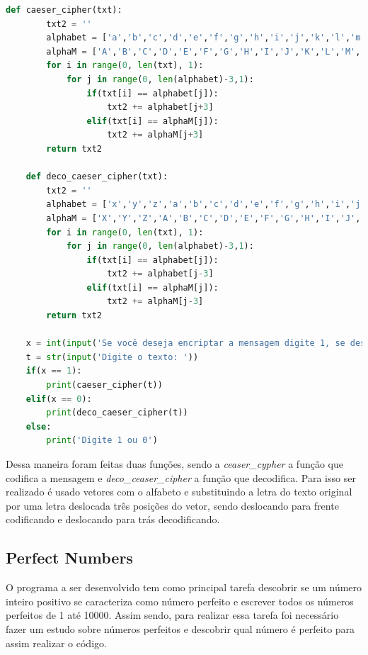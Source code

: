 \begin{lstlisting}[language=python]
    def caeser_cipher(txt):
        txt2 = ''
        alphabet = ['a','b','c','d','e','f','g','h','i','j','k','l','m','n','o','p','q','r','s','t','u','v','w','x','y','z','a','b','c']
        alphaM = ['A','B','C','D','E','F','G','H','I','J','K','L','M','N','O','P','Q','R','S','T','U','V','W','X','Y','Z','A','B','C']
        for i in range(0, len(txt), 1):
            for j in range(0, len(alphabet)-3,1):
                if(txt[i] == alphabet[j]):
                    txt2 += alphabet[j+3]
                elif(txt[i] == alphaM[j]):
                    txt2 += alphaM[j+3]
        return txt2

    def deco_caeser_cipher(txt):
        txt2 = ''
        alphabet = ['x','y','z','a','b','c','d','e','f','g','h','i','j','k','l','m','n','o','p','q','r','s','t','u','v','w','x','y','z']
        alphaM = ['X','Y','Z','A','B','C','D','E','F','G','H','I','J','K','L','M','N','O','P','Q','R','S','T','U','V','W','X','Y','Z']
        for i in range(0, len(txt), 1):
            for j in range(0, len(alphabet)-3,1):
                if(txt[i] == alphabet[j]):
                    txt2 += alphabet[j-3]
                elif(txt[i] == alphaM[j]):
                    txt2 += alphaM[j-3]
        return txt2

    x = int(input('Se você deseja encriptar a mensagem digite 1, se deseja descriptar digite 0: '))
    t = str(input('Digite o texto: '))
    if(x == 1):
        print(caeser_cipher(t))
    elif(x == 0):
        print(deco_caeser_cipher(t))
    else:
        print('Digite 1 ou 0')
\end{lstlisting}

Dessa maneira foram feitas duas funções, sendo a \textit{ceaser_cypher} a função que codifica a mensagem e \textit{deco_ceaser_cipher} a função que decodifica. Para isso ser realizado é usado vetores com o alfabeto e substituindo a letra do texto original por uma letra deslocada três posições do vetor, sendo deslocando para frente codificando e deslocando para trás decodificando.


\subsection{Perfect Numbers}

O programa a ser desenvolvido tem como principal tarefa descobrir se um número inteiro positivo se caracteriza como número perfeito e escrever todos os números perfeitos de 1 até 10000. Assim sendo, para realizar essa tarefa foi necessário fazer um estudo sobre números perfeitos \cite{Oquesãoo94:online} e descobrir qual número é perfeito para assim realizar o código.

